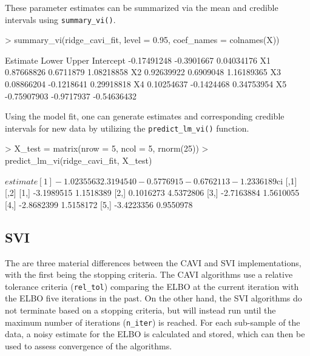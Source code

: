 \documentclass[]{article}
\let\code=\texttt
\newcommand{\fct}[1]{\code{#1()}}
\newenvironment{CodeChunk}{}{}
\begin{document}
These parameter estimates can be summarized via the mean and credible 
intervals using \fct{summary\_vi}. 
\begin{CodeChunk}
\begin{CodeInput}
> summary_vi(ridge_cavi_fit, level = 0.95, coef_names = colnames(X))
\end{CodeInput}
\begin{CodeOutput}
             Estimate      Lower       Upper
Intercept -0.17491248 -0.3901667  0.04034176
X1         0.87668826  0.6711879  1.08218858
X2         0.92639922  0.6909048  1.16189365
X3         0.08866204 -0.1218641  0.29918818
X4         0.10254637 -0.1424468  0.34753954
X5        -0.75907903 -0.9717937 -0.54636432
\end{CodeOutput}
\end{CodeChunk}
%
Using the model fit, one can generate estimates and corresponding credible 
intervals for new data by utilizing the \fct{predict\_lm\_vi} 
function. 
\begin{CodeChunk}
\begin{CodeInput}
> X_test = matrix(nrow = 5, ncol = 5, rnorm(25))
> predict_lm_vi(ridge_cavi_fit, X_test)
\end{CodeInput}
\begin{CodeOutput}
$estimate
[1] -1.0235563  2.3194540 -0.5776915 -0.6762113 -1.2336189

$ci
           [,1]      [,2]
[1,] -3.1989515 1.1518389
[2,]  0.1016273 4.5372806
[3,] -2.7163884 1.5610055
[4,] -2.8682399 1.5158172
[5,] -3.4223356 0.9550978
\end{CodeOutput}
\end{CodeChunk}

\subsection{SVI}

The are three material differences between the CAVI and SVI implementations,
with the first being the stopping criteria. The CAVI algorithms use a relative
tolerance criteria (\code{rel\_tol}) comparing the ELBO at the current iteration
with the ELBO five iterations in the past. On the other hand, the SVI algorithms
do not terminate based on a stopping criteria, but will instead run until the
maximum number of iterations (\code{n\_iter}) is reached. For each sub-sample of
the data, a noisy estimate for the ELBO is calculated and stored, which can then
be used to assess convergence of the algorithms. 
\end{document}
